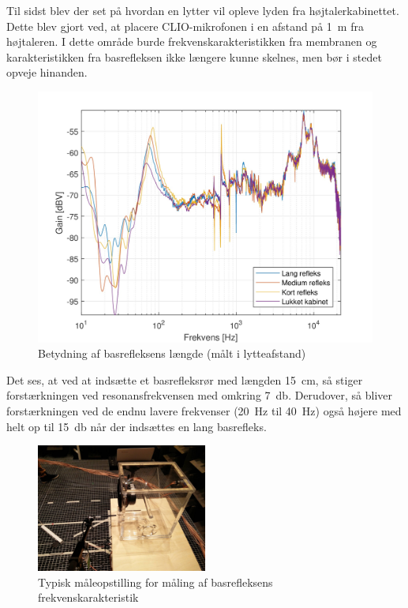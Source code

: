 \newpage
Til sidst blev der set på hvordan en lytter vil opleve lyden fra højtalerkabinettet. Dette blev gjort ved, at placere CLIO-mikrofonen i en afstand på \SI{1}{\meter} fra højtaleren. I dette område burde frekvenskarakteristikken fra membranen og karakteristikken fra basrefleksen ikke længere kunne skelnes, men bør i stedet opveje hinanden.
\begin{figure}[H]
	\centering
	\vspace{-12pt}
	\includegraphics[width=\textwidth]{Billeder/Grafer/BasrefleksLengthFar}
	\caption{Betydning af basrefleksens længde (målt i lytteafstand)}
\end{figure}

Det ses, at ved at indsætte et basrefleksrør med længden \SI{15}{\centi\meter}, så stiger forstærkningen ved resonansfrekvensen med omkring \SI{7}{\decibel}. Derudover, så bliver forstærkningen ved de endnu lavere frekvenser (\SI{20}{\hertz} til \SI{40}{\hertz}) også højere med helt op til \SI{15}{\decibel} når der indsættes en lang basrefleks.
\begin{figure}[H]
	\centering
	\includegraphics[width=0.5\textwidth]{Billeder/MaalBasrefleks}
	\caption{Typisk måleopstilling for måling af basrefleksens frekvenskarakteristik}
\end{figure}